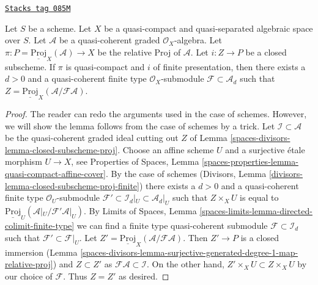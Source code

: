 \begin{lemma}
\label{spaces-divisors-lemma-closed-subscheme-proj-finite}
\href{https://stacks.math.columbia.edu/tag/085M}{\texttt{Stacks tag 085M}}

Let $S$ be a scheme. Let $X$ be a quasi-compact and quasi-separated
algebraic space over $S$.
Let $\mathcal{A}$ be a quasi-coherent graded $\mathcal{O}_X$-algebra. Let
$\pi : P = \underline{\text{Proj}}_X(\mathcal{A}) \to X$ be the relative
Proj of $\mathcal{A}$. Let $i : Z \to P$ be a closed subscheme.
If $\pi$ is quasi-compact and $i$ of finite presentation, then there exists
a $d > 0$ and a quasi-coherent finite type $\mathcal{O}_X$-submodule
$\mathcal{F} \subset \mathcal{A}_d$ such that
$Z = \underline{\text{Proj}}_X(\mathcal{A}/\mathcal{F}\mathcal{A})$.
\end{lemma}

\begin{proof}
The reader can redo the arguments used in the case of schemes. However, we
will show the lemma follows from the case of schemes by a trick.
Let $\mathcal{I} \subset \mathcal{A}$ be the quasi-coherent graded
ideal cutting out $Z$ of Lemma \ref{spaces-divisors-lemma-closed-subscheme-proj}.
Choose an affine scheme $U$ and a surjective \'etale morphism
$U \to X$, see Properties of Spaces, Lemma
\ref{spaces-properties-lemma-quasi-compact-affine-cover}.
By the case of schemes
(Divisors, Lemma \ref{divisors-lemma-closed-subscheme-proj-finite})
there exists a $d > 0$ and a quasi-coherent finite type
$\mathcal{O}_U$-submodule
$\mathcal{F}' \subset \mathcal{I}_d|_U \subset \mathcal{A}_d|_U$
such that $Z \times_X U$ is equal to
$\underline{\text{Proj}}_U(\mathcal{A}|_U/\mathcal{F}'\mathcal{A}|_U)$.
By Limits of Spaces, Lemma
\ref{spaces-limits-lemma-directed-colimit-finite-type}
we can find a finite type quasi-coherent submodule
$\mathcal{F} \subset \mathcal{I}_d$ such that
$\mathcal{F}' \subset \mathcal{F}|_U$. Let
$Z' = \underline{\text{Proj}}_X(\mathcal{A}/\mathcal{F}\mathcal{A})$.
Then $Z' \to P$ is a closed immersion
(Lemma \ref{spaces-divisors-lemma-surjective-generated-degree-1-map-relative-proj})
and $Z \subset Z'$ as $\mathcal{F}\mathcal{A} \subset \mathcal{I}$.
On the other hand, $Z' \times_X U \subset Z \times_X U$ by our
choice of $\mathcal{F}$. Thus $Z = Z'$ as desired.
\end{proof}

